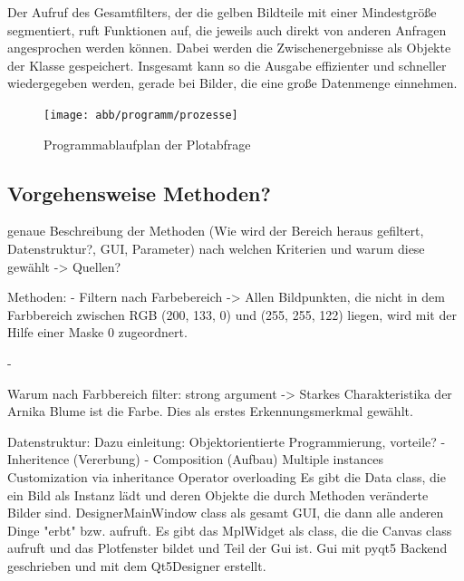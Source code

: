 Der Aufruf des Gesamtfilters, der die gelben Bildteile mit einer Mindestgröße segmentiert, ruft Funktionen auf, die jeweils auch direkt von anderen Anfragen angesprochen werden können. Dabei werden die Zwischenergebnisse als Objekte der Klasse gespeichert. Insgesamt kann so die Ausgabe effizienter und schneller wiedergegeben werden, gerade bei Bilder, die eine große Datenmenge einnehmen.


\begin{figure}[htb]
 \centering
 \texttt{[image: abb/programm/prozesse]}
 \caption{Programmablaufplan der Plotabfrage}
\label{fig:flowchart}
\end{figure}

\subsection{Vorgehensweise Methoden?}

genaue Beschreibung der Methoden (Wie wird der Bereich heraus gefiltert, Datenstruktur?, GUI, Parameter)
nach welchen Kriterien und warum diese gewählt -> Quellen?

Methoden: 
- Filtern nach Farbebereich ->
Allen Bildpunkten, die nicht in dem Farbbereich zwischen RGB (200, 133, 0) und (255, 255, 122) liegen, wird mit der Hilfe einer Maske 0 zugeordnert. 

- 

Warum nach Farbbereich filter:
strong argument -> Starkes Charakteristika der Arnika Blume ist die Farbe. Dies als erstes Erkennungsmerkmal gewählt.


Datenstruktur:
Dazu einleitung: Objektorientierte Programmierung, vorteile?
- Inheritence (Vererbung)
- Composition (Aufbau)
Multiple instances
Customization via inheritance
Operator overloading
Es gibt die Data class, die ein Bild als Instanz lädt und deren Objekte die durch Methoden veränderte Bilder sind. 
DesignerMainWindow class als gesamt GUI, die dann alle anderen Dinge "erbt" bzw. aufruft.
Es gibt das MplWidget als class, die die Canvas class aufruft und das Plotfenster bildet und Teil der Gui ist. 
Gui mit pyqt5 Backend geschrieben und mit dem Qt5Designer erstellt.



